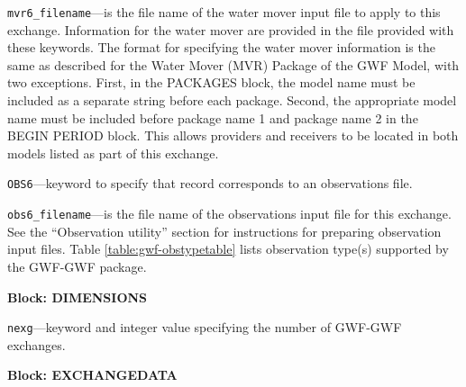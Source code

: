 \begin{description}
\item \texttt{mvr6\_filename}---is the file name of the water mover input file to apply to this exchange.  Information for the water mover are provided in the file provided with these keywords.  The format for specifying the water mover information is the same as described for the Water Mover (MVR) Package of the GWF Model, with two exceptions.  First, in the PACKAGES block, the model name must be included as a separate string before each package.  Second, the appropriate model name must be included before package name 1 and package name 2 in the BEGIN PERIOD block.  This allows providers and receivers to be located in both models listed as part of this exchange.

\item \texttt{OBS6}---keyword to specify that record corresponds to an observations file.

\item \texttt{obs6\_filename}---is the file name of the observations input file for this exchange. See the ``Observation utility'' section for instructions for preparing observation input files. Table \ref{table:gwf-obstypetable} lists observation type(s) supported by the GWF-GWF package.

\end{description}
\item \textbf{Block: DIMENSIONS}

\begin{description}
\item \texttt{nexg}---keyword and integer value specifying the number of GWF-GWF exchanges.

\end{description}
\item \textbf{Block: EXCHANGEDATA}

